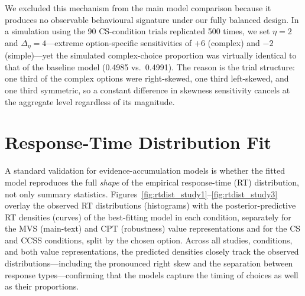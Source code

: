 \documentclass[man,floatsintext]{apa7}
\begin{document}
We excluded this mechanism from the main model comparison because it produces no observable behavioural signature under our fully balanced design. In a simulation using the 90 CS-condition trials replicated 500 times, we set $\eta = 2$ and $\Delta_\eta = 4$---extreme option-specific sensitivities of $+6$ (complex) and $-2$ (simple)---yet the simulated complex-choice proportion was virtually identical to that of the baseline model (0.4985 vs.\ 0.4991). The reason is the trial structure: one third of the complex options were right-skewed, one third left-skewed, and one third symmetric, so a constant difference in skewness sensitivity cancels at the aggregate level regardless of its magnitude.


\section{Response-Time Distribution Fit}
\label{sec:rtdist}

A standard validation for evidence-accumulation models is whether the fitted model reproduces the full \emph{shape} of the empirical response-time (RT) distribution, not only summary statistics. Figures~\ref{fig:rtdist_study1}--\ref{fig:rtdist_study3} overlay the observed RT distributions (histograms) with the posterior-predictive RT densities (curves) of the best-fitting model in each condition, separately for the MVS (main-text) and CPT (robustness) value representations and for the CS and CCSS conditions, split by the chosen option. Across all studies, conditions, and both value representations, the predicted densities closely track the observed distributions---including the pronounced right skew and the separation between response types---confirming that the models capture the timing of choices as well as their proportions.
\end{document}
